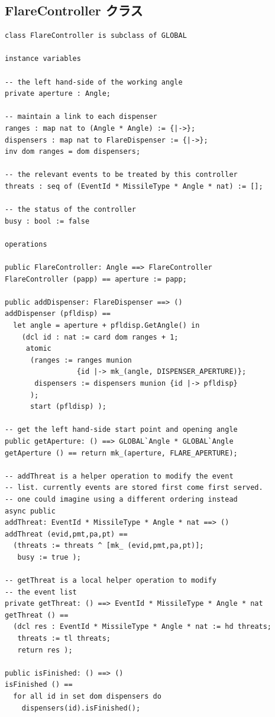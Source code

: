 \documentclass[\pformat,12pt]{jreport}
\begin{document}
\subsection{FlareController クラス}

\begin{lstlisting}
class FlareController is subclass of GLOBAL

instance variables

-- the left hand-side of the working angle
private aperture : Angle;

-- maintain a link to each dispenser
ranges : map nat to (Angle * Angle) := {|->};
dispensers : map nat to FlareDispenser := {|->};
inv dom ranges = dom dispensers;

-- the relevant events to be treated by this controller
threats : seq of (EventId * MissileType * Angle * nat) := [];

-- the status of the controller
busy : bool := false

operations

public FlareController: Angle ==> FlareController
FlareController (papp) == aperture := papp;

public addDispenser: FlareDispenser ==> ()
addDispenser (pfldisp) ==
  let angle = aperture + pfldisp.GetAngle() in
    (dcl id : nat := card dom ranges + 1;
     atomic
      (ranges := ranges munion 
                 {id |-> mk_(angle, DISPENSER_APERTURE)};
       dispensers := dispensers munion {id |-> pfldisp}
      );
      start (pfldisp) );

-- get the left hand-side start point and opening angle
public getAperture: () ==> GLOBAL`Angle * GLOBAL`Angle
getAperture () == return mk_(aperture, FLARE_APERTURE);

-- addThreat is a helper operation to modify the event
-- list. currently events are stored first come first served.
-- one could imagine using a different ordering instead
async public
addThreat: EventId * MissileType * Angle * nat ==> ()
addThreat (evid,pmt,pa,pt) ==
  (threats := threats ^ [mk_ (evid,pmt,pa,pt)];
   busy := true );

-- getThreat is a local helper operation to modify 
-- the event list
private getThreat: () ==> EventId * MissileType * Angle * nat
getThreat () ==
  (dcl res : EventId * MissileType * Angle * nat := hd threats;
   threats := tl threats;
   return res );

public isFinished: () ==> ()
isFinished () ==
  for all id in set dom dispensers do
    dispensers(id).isFinished();


\end{lstlisting}
\end{document}
